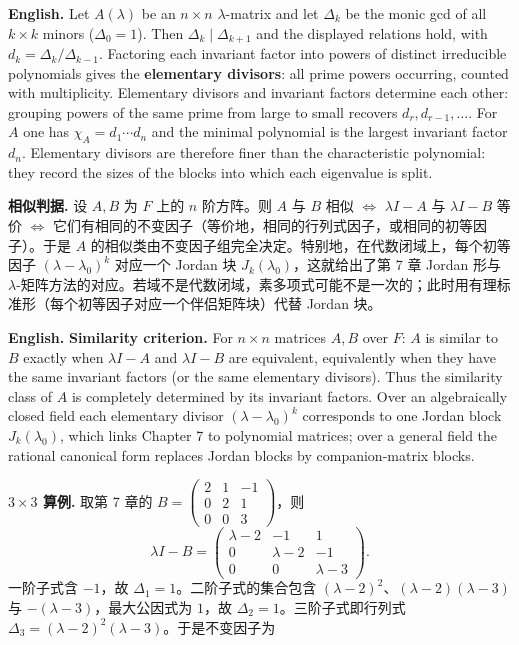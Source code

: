 \documentclass[UTF8,11pt,a4paper]{ctexart}
\newcommand{\EN}[1]{\par\noindent\textbf{English.} #1\par}
\begin{document}
\EN{Let $A(\lambda)$ be an $n\times n$ $\lambda$-matrix and let $\Delta_k$ be the monic gcd of all $k\times k$ minors ($\Delta_0=1$). Then $\Delta_k\mid\Delta_{k+1}$ and the displayed relations hold, with $d_k=\Delta_k/\Delta_{k-1}$. Factoring each invariant factor into powers of distinct irreducible polynomials gives the \textbf{elementary divisors}: all prime powers occurring, counted with multiplicity. Elementary divisors and invariant factors determine each other: grouping powers of the same prime from large to small recovers $d_r,d_{r-1},\dots$. For $A$ one has $\chi_A=d_1\cdots d_n$ and the minimal polynomial is the largest invariant factor $d_n$. Elementary divisors are therefore finer than the characteristic polynomial: they record the sizes of the blocks into which each eigenvalue is split.}
\noindent\textbf{相似判据.} 设 $A,B$ 为 $F$ 上的 $n$ 阶方阵。则 $A$ 与 $B$ 相似 $\iff$ $\lambda I-A$ 与 $\lambda I-B$ 等价 $\iff$ 它们有相同的不变因子（等价地，相同的行列式因子，或相同的初等因子）。于是 $A$ 的相似类由不变因子组完全决定。特别地，在代数闭域上，每个初等因子 $(\lambda-\lambda_0)^k$ 对应一个 Jordan 块 $J_k(\lambda_0)$，这就给出了第 7 章 Jordan 形与 $\lambda$-矩阵方法的对应。若域不是代数闭域，素多项式可能不是一次的；此时用有理标准形（每个初等因子对应一个伴侣矩阵块）代替 Jordan 块。
\EN{\textbf{Similarity criterion.} For $n\times n$ matrices $A,B$ over $F$: $A$ is similar to $B$ exactly when $\lambda I-A$ and $\lambda I-B$ are equivalent, equivalently when they have the same invariant factors (or the same elementary divisors). Thus the similarity class of $A$ is completely determined by its invariant factors. Over an algebraically closed field each elementary divisor $(\lambda-\lambda_0)^k$ corresponds to one Jordan block $J_k(\lambda_0)$, which links Chapter 7 to polynomial matrices; over a general field the rational canonical form replaces Jordan blocks by companion-matrix blocks.}
\noindent\textbf{$3\times3$ 算例.} 取第 7 章的 $B=\begin{pmatrix}2&1&-1\\0&2&1\\0&0&3\end{pmatrix}$，则
\[
\lambda I-B=\begin{pmatrix}\lambda-2&-1&1\\0&\lambda-2&-1\\0&0&\lambda-3\end{pmatrix}.
\]
一阶子式含 $-1$，故 $\Delta_1=1$。二阶子式的集合包含 $(\lambda-2)^2$、$(\lambda-2)(\lambda-3)$ 与 $-(\lambda-3)$，最大公因式为 $1$，故 $\Delta_2=1$。三阶子式即行列式 $\Delta_3=(\lambda-2)^2(\lambda-3)$。于是不变因子为
\end{document}
